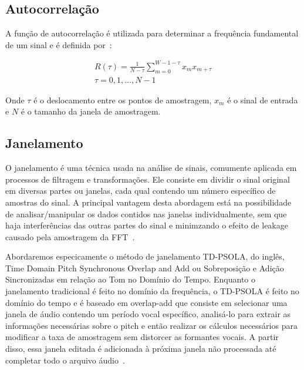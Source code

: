 \documentclass{sbrt}
\begin{document}
\subsection{Autocorrelação}

A função de autocorrelação é utilizada para determinar a frequência fundamental de um sinal e é definida por~\cite{fong2016adaptive}:

\begin{equation}
  \begin{gathered}
    R(\tau) = \frac{1}{N - \tau} \sum_{m=0}^{W - 1 - \tau} x_m x_{m + \tau} \\
    \tau = 0, 1, \dots, N - 1
  \end{gathered}
\end{equation}

Onde $\tau$ é o deslocamento entre os pontos de amostragem, $x_m$ é o sinal de entrada e $N$ é o tamanho da janela de amostragem.

\subsection{Janelamento}

O janelamento é uma técnica usada na análise de sinais, comumente aplicada em processos de filtragem e transformações.
Ele consiste em dividir o sinal original em diversas partes ou janelas, cada qual contendo um número específico de
amostras do sinal. A principal vantagem desta abordagem está na possibilidade de analisar/manipular os dados contidos
nas janelas individualmente, sem que haja interferências das outras partes do sinal e minimzando o efeito de leakage
causado pela amostragem da FFT~\cite{deimplementaccao}.

Abordaremos especicamente o método de janelamento TD-PSOLA, do inglês, Time Domain Pitch Synchronous Overlap and Add ou
Sobreposição e Adição Sincronizadas em relação ao Tom no Domínio do Tempo. Enquanto o janelamento tradicional é feito
no domínio da frequência, o TD-PSOLA é feito no domínio do tempo e é baseado em overlap-add que consiste em selecionar uma janela de áudio contendo um período vocal específico, analisá-lo para extrair as informações necessárias sobre o pitch e então realizar os cálculos necessários para modificar a taxa de amostragem sem distorcer as formantes vocais. A partir disso, essa janela editada é adicionada à próxima janela não processada até completar todo o arquivo áudio~\cite{cheng2012design}.

\end{document}
